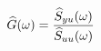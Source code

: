 \documentclass[preview]{standalone}
\begin{document}
\begin{align*}
\special{dvisvgm:raw <g id='unique000'>}\widehat{G}(\omega)=\frac{\widehat{S}_{yu}(\omega)}{\widehat{S}_{uu}(\omega)}\special{dvisvgm:raw </g>}
\end{align*}
\end{document}
